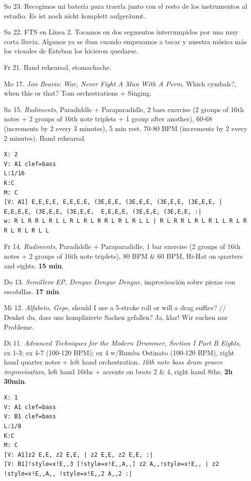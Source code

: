 \documentclass[
]{book}
\begin{document}
So 23. Recogimos mi batería para traerla junto con el resto de los instrumentos al estudio. Es ist noch nicht komplett aufgeräumt.

Sa 22. FTS en Línea 2. Tocamos en dos segmentos interrumpidos por una muy corta lluvia. Algunos ya se iban cuando empezamos a tocar y nuestra música más los visuales de Esteban los hicieron quedarse.

Fr 21. Band rehearsal, stomachache.

Mo 17. \emph{Jon Beavis: War, Never Fight A Man With A Perm}. Which cymbals?, when this or that? Tom orchestrations + Singing.

Sa 15. \emph{Rudiments}, Paradiddle + Paraparadidle, 2 bars exercise (2 groups of 16th notes + 2 groups of 16th note triplets + 1 group after another), 60-68 (increments by 2 every 3 minutes), 5 min rest, 70-80 BPM (increments by 2 every 2 minutes). Band rehearsal.

\begin{verbatim}
X: 2
V: A1 clef=bass
L:1/16
K:C
M: C 
[V: A1] E,E,E,E, E,E,E,E, (3E,E,E, (3E,E,E, (3E,E,E, (3E,E,E, | E,E,E,E, (3E,E,E, (3E,E,E,  E,E,E,E, (3E,E,E, (3E,E,E, :|
w: R L R R L R L L R L R L R R L R L R L L | R L R R L R L R L L R L R R L R L R L L 
\end{verbatim}

Fr 14. \emph{Rudiments}, Paradiddle + Paraparadidle, 1 bar exercise (2 groups of 16th notes + 2 groups of 16th note triplets), 80 BPM \& 60 BPM, Hi-Hat on quarters and eights. \textbf{15 min}.

Do 13. \emph{Semillero EP, Dengue Dengue Dengue}, improvisación sobre piezas con escobillas. \textbf{17 min}.

Mi 12. \emph{Alfabeto, Gepe}, should I use a 5-stroke roll or will a drag suffice? // Denkst du, dass uns komplizierte Sachen gefallen? Ja, klar! Wir suchen nur Probleme.

Di 11. \emph{Advanced Techniques for the Modern Drummer, Section I Part B Eights}, ex 1-3; ex 4-7 (100-120 BPM); ex 4 w/Rumba Ostinato (100-120 BPM), right hand quarter notes + left hand orchestration. \emph{16th note bass drum groove improvisation}, left hand 16ths + accents on beats 2 \& 4, right hand 8ths. \textbf{2h 30min}.

\begin{verbatim}
X: 1
V: A1 clef=bass
V: B1 clef=bass
L:1/8
K:C
M: C
[V: A1]z2 E,E, z2 E,E, | z2 E,E, z2 E,E, :|
[V: B1]!style=x!E,,3 [!style=x!E,,A,,] z2 A,,!style=x!E,, | z2 !style=x!E,,A,, !style=x!E,,2 A,,2 :|
\end{verbatim}
\end{document}
